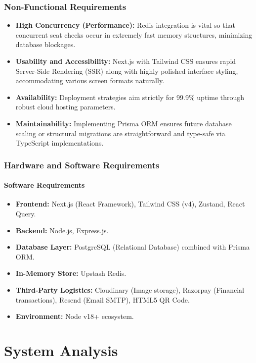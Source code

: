 \documentclass[12pt,a4paper]{report}
\begin{document}
\subsection{Non-Functional Requirements}

\begin{itemize}
    \item \textbf{High Concurrency (Performance):} Redis integration is vital so that concurrent seat checks occur in extremely fast memory structures, minimizing database blockages.
    \item \textbf{Usability and Accessibility:} Next.js with Tailwind CSS ensures rapid Server-Side Rendering (SSR) along with highly polished interface styling, accommodating various screen formats naturally.
    \item \textbf{Availability:} Deployment strategies aim strictly for 99.9\% uptime through robust cloud hosting parameters.
    \item \textbf{Maintainability:} Implementing Prisma ORM ensures future database scaling or structural migrations are straightforward and type-safe via TypeScript implementations.
\end{itemize}

\subsection{Hardware and Software Requirements}

\subsubsection*{Software Requirements}
\begin{itemize}
    \item \textbf{Frontend:} Next.js (React Framework), Tailwind CSS (v4), Zustand, React Query.
    \item \textbf{Backend:} Node.js, Express.js.
    \item \textbf{Database Layer:} PostgreSQL (Relational Database) combined with Prisma ORM.
    \item \textbf{In-Memory Store:} Upstash Redis.
    \item \textbf{Third-Party Logistics:} Cloudinary (Image storage), Razorpay (Financial transactions), Resend (Email SMTP), HTML5 QR Code.
    \item \textbf{Environment:} Node v18+ ecosystem.
\end{itemize}

\chapter{System Analysis}
\end{document}
